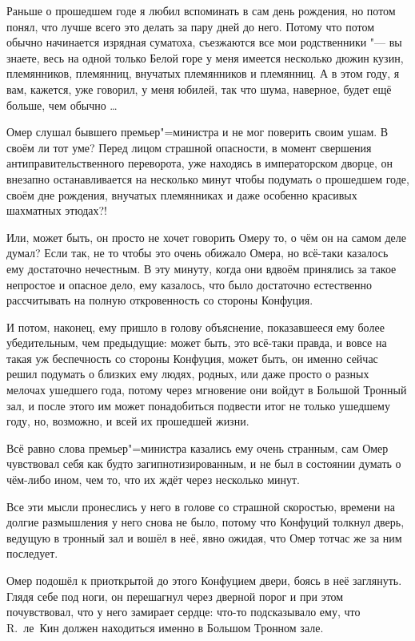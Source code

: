 Раньше о прошедшем годе я любил вспоминать в сам день рождения, но потом понял,
что лучше всего это делать за пару дней до него.
Потому что потом обычно начинается изрядная суматоха, съезжаются все мои
родственники "--- вы знаете, весь на одной только Белой горе у меня имеется
несколько дюжин кузин, племянников, племянниц, внучатых племянников и племянниц.
А в этом году, я вам, кажется, уже говорил, у меня юбилей, так что шума,
наверное, будет ещё больше, чем обычно \ldots

Омер слушал бывшего премьер"=министра и не мог поверить своим ушам.
В своём ли тот уме?
Перед лицом страшной опасности, в момент свершения антиправительственного
переворота, уже находясь в императорском дворце, он внезапно останавливается на
несколько минут чтобы подумать о прошедшем годе, своём дне рождения, внучатых
племянниках и даже особенно красивых шахматных этюдах?!

Или, может быть, он просто не хочет говорить Омеру то, о чём он на самом деле
думал?
Если так, не то чтобы это очень обижало Омера, но всё-таки казалось ему
достаточно нечестным.
В эту минуту, когда они вдвоём принялись за такое непростое и опасное дело, ему
казалось, что было достаточно естественно рассчитывать на полную откровенность
со стороны Конфуция.

И потом, наконец, ему пришло в голову объяснение, показавшееся ему более
убедительным, чем предыдущие: может быть, это всё-таки правда, и вовсе на такая
уж беспечность со стороны Конфуция, может быть, он именно сейчас решил подумать
о близких ему людях, родных, или даже просто о разных мелочах ушедшего года,
потому через мгновение они войдут в Большой Тронный зал, и после этого им может
понадобиться подвести итог не только ушедшему году, но, возможно, и всей их
прошедшей жизни.

Всё равно слова премьер"=министра казались ему очень странным, сам Омер
чувствовал себя как будто загипнотизированным, и не был в состоянии думать о
чём-либо ином, чем то, что их ждёт через несколько минут.

Все эти мысли пронеслись у него в голове со страшной скоростью, времени на
долгие размышления у него снова не было, потому что Конфуций толкнул дверь,
ведущую в тронный зал и вошёл в неё, явно ожидая, что Омер тотчас же за ним
последует.

Омер подошёл к приоткрытой до этого Конфуцием двери, боясь в неё заглянуть.
Глядя себе под ноги, он перешагнул через дверной порог и при этом почувствовал,
что у него замирает сердце: что-то подсказывало ему, что R.~ле~Кин должен
находиться именно в Большом Тронном зале.


